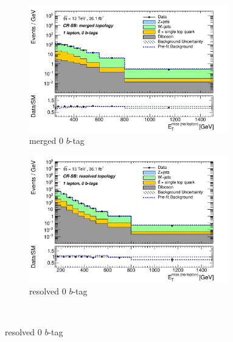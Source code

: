 \begin{figure}[htbp]
\centering
  \begin{subfigure}{0.45\textwidth}
    \centering
    \includegraphics[width=0.95\textwidth]{figures/monoV/postfit/monoV_1lep_0tag_merged_massFail_met_XS.pdf}
    \caption{merged 0 \(b\)-tag}
  \end{subfigure}
    \begin{subfigure}{0.45\textwidth}
    \centering
    \includegraphics[width=0.95\textwidth]{figures/monoV/postfit/monoV_1lep_0tag_resolved_massFail_met_XS.pdf}
    \caption{resolved 0 \(b\)-tag}
  \end{subfigure} \\


\end{figure}
